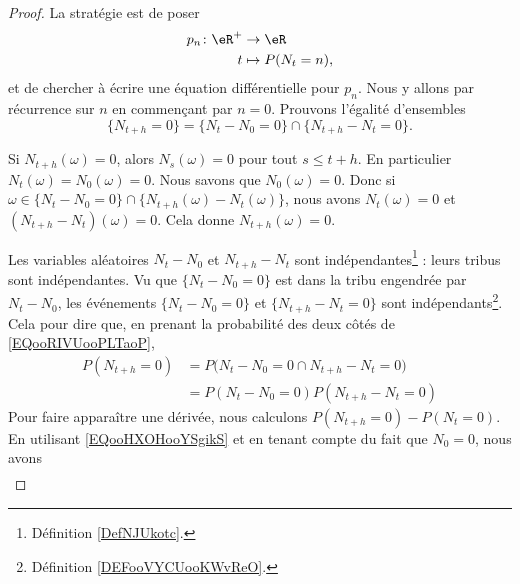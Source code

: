 \begin{proof}
	La stratégie est de poser
	\begin{equation}
		\begin{aligned}
			p_n\colon \eR^+ & \to \eR           \\
			t               & \mapsto P(N_t=n),
		\end{aligned}
	\end{equation}
	et de chercher à écrire une équation différentielle pour \( p_n\). Nous y allons par récurrence sur \( n\) en commençant par \( n=0\). Prouvons l'égalité d'ensembles
	\begin{equation}		\label{EQooRIVUooPLTaoP}
		\{ N_{t+h}=0 \}=\{ N_t-N_0=0 \}\cap \{ N_{t+h}-N_t=0 \}.
	\end{equation}
	\begin{subproof}
		Si \( N_{t+h}(\omega)=0\), alors \( N_s(\omega)=0\) pour tout \(  s\leq t+h\). En particulier \( N_t(\omega)=N_0(\omega)=0\).
		Nous savons que \( N_0(\omega)=0\). Donc si \(\omega\in \{ N_t-N_0=0 \}\cap\{ N_{t+h}(\omega)-N_t(\omega) \} \), nous avons \( N_t(\omega)=0\) et \( (N_{t+h}-N_t)(\omega)=0\). Cela donne \( N_{t+h}(\omega)=0\).
	\end{subproof}
	Les variables aléatoires \( N_t-N_0\) et \( N_{t+h}-N_t\) sont indépendantes\footnote{Définition \ref{DefNJUkotc}.} :  leurs tribus sont indépendantes. Vu que \( \{ N_t-N_0=0 \}\) est dans la tribu engendrée par \( N_t-N_0\), les événements \( \{ N_t-N_0=0 \}\) et \( \{ N_{t+h}-N_t=0 \}\) sont indépendants\footnote{Définition \ref{DEFooVYCUooKWvReO}.}. Cela pour dire que, en prenant la probabilité des deux côtés de \eqref{EQooRIVUooPLTaoP},
	\begin{subequations}	\label{EQooHXOHooYSgikS}
		\begin{align}
			P(N_{t+h}=0) & = P\big( N_t-N_0=0 \cap N_{t+h}-N_t=0\big) \\
			             & =P(N_t-N_0=0)P(N_{t+h}-N_t=0)
		\end{align}
	\end{subequations}
	Pour faire apparaître une dérivée, nous calculons \( P(N_{t+h}=0)-P(N_t=0)\). En utilisant \eqref{EQooHXOHooYSgikS} et en tenant compte du fait que \( N_0=0\), nous avons
	\begin{subequations}		\label{SUBEQSooBYPTooUkROAX}
		\begin{align}

\end{align}
\end{subequations}
\end{proof}
